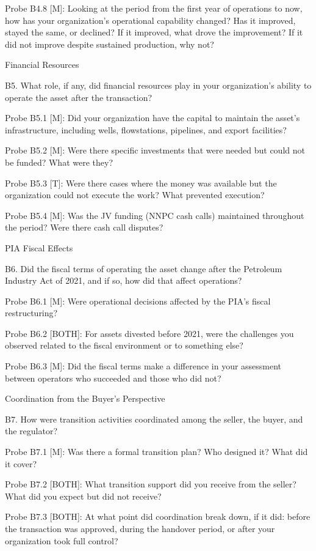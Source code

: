 Probe B4.8 {[}M{]}: Looking at the period from the first year of
operations to now, how has your organization's operational capability
changed? Has it improved, stayed the same, or declined? If it improved,
what drove the improvement? If it did not improve despite sustained
production, why not?

Financial Resources

B5. What role, if any, did financial resources play in your
organization's ability to operate the asset after the transaction?

Probe B5.1 {[}M{]}: Did your organization have the capital to maintain
the asset's infrastructure, including wells, flowstations, pipelines,
and export facilities?

Probe B5.2 {[}M{]}: Were there specific investments that were needed but
could not be funded? What were they?

Probe B5.3 {[}T{]}: Were there cases where the money was available but
the organization could not execute the work? What prevented execution?

Probe B5.4 {[}M{]}: Was the JV funding (NNPC cash calls) maintained
throughout the period? Were there cash call disputes?

PIA Fiscal Effects

B6. Did the fiscal terms of operating the asset change after the
Petroleum Industry Act of 2021, and if so, how did that affect
operations?

Probe B6.1 {[}M{]}: Were operational decisions affected by the PIA's
fiscal restructuring?

Probe B6.2 {[}BOTH{]}: For assets divested before 2021, were the
challenges you observed related to the fiscal environment or to
something else?

Probe B6.3 {[}M{]}: Did the fiscal terms make a difference in your
assessment between operators who succeeded and those who did not?

Coordination from the Buyer's Perspective

B7. How were transition activities coordinated among the seller, the
buyer, and the regulator?

Probe B7.1 {[}M{]}: Was there a formal transition plan? Who designed it?
What did it cover?

Probe B7.2 {[}BOTH{]}: What transition support did you receive from the
seller? What did you expect but did not receive?

Probe B7.3 {[}BOTH{]}: At what point did coordination break down, if it
did: before the transaction was approved, during the handover period, or
after your organization took full control?


